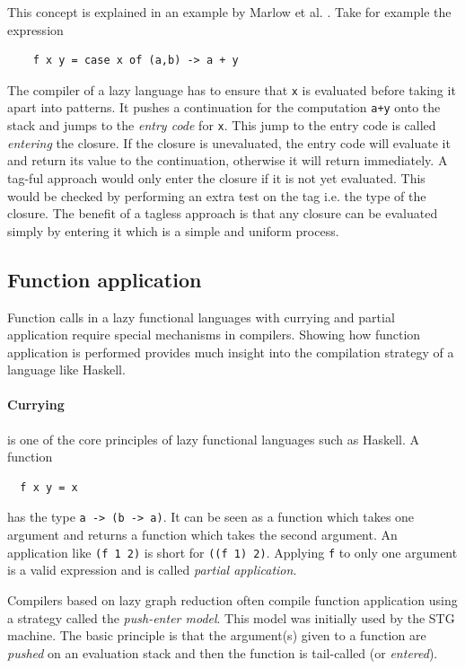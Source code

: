 \documentclass[runningheads]{llncs}
\begin{document}
This concept is explained in an example by Marlow et al. \cite{marlow2007faster}. Take for example the expression

\begin{center}
	\begin{BVerbatim}
	f x y = case x of (a,b) -> a + y
	\end{BVerbatim}
\end{center}

The compiler of a lazy language has to ensure that \texttt{x} is evaluated before taking it apart into patterns. It pushes a continuation for the computation \texttt{a+y} onto the stack and jumps to the \textit{entry code} for \texttt{x}. This jump to the entry code is called \textit{entering} the closure. If the closure is unevaluated, the entry code will evaluate it and return its value to the continuation, otherwise it will return immediately.
A tag-ful approach would only enter the closure if it is not yet evaluated. This would be checked by performing an extra test on the tag i.e. the type of the closure. The benefit of a tagless approach is that any closure can be evaluated simply by entering it which is a simple and uniform process. \cite{marlow2007faster}



\subsection{Function application}
Function calls in a lazy functional languages with currying and partial application require special mechanisms in compilers. Showing how function application is performed provides much insight into the compilation strategy of a language like Haskell.

\paragraph{Currying} is one of the core principles of lazy functional languages such as Haskell. A function
\begin{verbatim}
  f x y = x
\end{verbatim}
has the type \texttt{a -> (b -> a)}. It can be seen as a function which takes one argument and returns a function which takes the second argument. An application like \texttt{(f 1 2)} is short for \texttt{((f 1) 2)}. Applying \texttt{f} to only one argument is a valid expression and is called \textit{partial application}.

Compilers based on lazy graph reduction often compile function application using a strategy called the \textit{push-enter model}. This model was initially used by the STG machine. The basic principle is that the argument(s) given to a function are \textit{pushed} on an evaluation stack and then the function is tail-called (or \textit{entered})\cite{jones1992implementing}.
\end{document}
